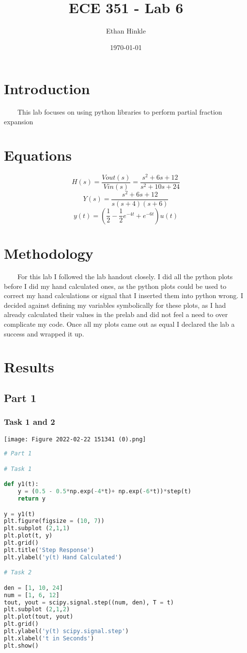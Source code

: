 \documentclass[11pt,a4]{article}
\title{ECE 351 - Lab 6}
\author{Ethan Hinkle}
\date{\today}
\begin{document}
\maketitle

\section{Introduction}
\ \ \ \ This lab focuses on using python libraries to perform partial fraction expansion

\section{Equations}

$$H(s)=\frac{Vout(s)}{Vin(s)} = \frac{s^2 + 6s + 12}{s^2 + 10s + 24}$$
$$Y(s) = \frac{s^2 + 6s + 12}{s(s + 4)(s + 6)}$$
$$y(t) = (\frac{1}{2} - \frac{1}{2}e^{-4t} + e^{-6t})u(t)$$

\section{Methodology}
\ \ \ \ For this lab I followed the lab handout closely. I did all the python plots before I did my hand calculated ones, as the python plots could be used to correct my hand calculations or signal that I inserted them into python wrong. I decided against defining my variables symbolically for these plots, as I had already calculated their values in the prelab and did not feel a need to over complicate my code. Once all my plots came out as equal I declared the lab a success and wrapped it up.

\section{Results}

\subsection{Part 1}

\subsubsection{Task 1 and 2}

\texttt{[image: Figure 2022-02-22 151341 (0).png]}

\begin{lstlisting}[language=Python]
# Part 1

# Task 1

def y1(t):
    y = (0.5 - 0.5*np.exp(-4*t)+ np.exp(-6*t))*step(t)
    return y

y = y1(t)
plt.figure(figsize = (10, 7))
plt.subplot (2,1,1)
plt.plot(t, y)
plt.grid()
plt.title('Step Response')
plt.ylabel('y(t) Hand Calculated')

# Task 2

den = [1, 10, 24]
num = [1, 6, 12]
tout, yout = scipy.signal.step((num, den), T = t)
plt.subplot (2,1,2)
plt.plot(tout, yout)
plt.grid()
plt.ylabel('y(t) scipy.signal.step')
plt.xlabel('t in Seconds')
plt.show()
\end{lstlisting}
\end{document}
